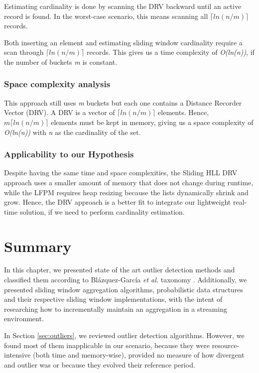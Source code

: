 Estimating cardinality is done by scanning the DRV backward until an active record is found. In the worst-case scenario, this means scanning all \textit{$\lceil ln(n/m) \rceil$} records.

Both inserting an element and estimating sliding window cardinality require a scan through \textit{$\lceil ln(n/m) \rceil$} records. This gives us a time complexity of \textit{O(\textit{ln(n)})}, if the number of buckets \textit{m} is constant. 

\subsubsection*{Space complexity analysis}
This approach still uses \textit{m} buckets but each one contains a Distance Recorder Vector (DRV). A DRV is a vector of \textit{$\lceil ln(n/m) \rceil$} elements. Hence, \textit{$m \lceil ln(n/m) \rceil$} elements must be kept in memory, giving us a space complexity of \textit{O(ln(n))} with \textit{n} as the cardinality of the set.

\subsubsection*{Applicability to our Hypothesis}
Despite having the same time and space complexities, the Sliding HLL DRV approach uses a smaller amount of memory that does not change during runtime, while the LFPM requires heap resizing because the lists dynamically shrink and grow. Hence, the DRV approach is a better fit to integrate our lightweight real-time solution, if we need to perform cardinality estimation.


\section{Summary}
In this chapter, we presented state of the art outlier detection methods and classified them according to Blázquez-García \emph{et al.} taxonomy \cite{Blazquez-Garcia-Review-Anomaly-Detection}. Additionally, we presented sliding window aggregation algorithms, probabilistic data structures and their respective sliding window implementations, with the intent of researching how to incrementally maintain an aggregation in a streaming environment.

In Section \ref{sec:outliers}, we reviewed outlier detection algorithms. However, we found most of them inapplicable in our scenario, because they were resource-intensive (both time and memory-wise), provided no measure of how divergent and outlier was or because they evolved their reference period.

